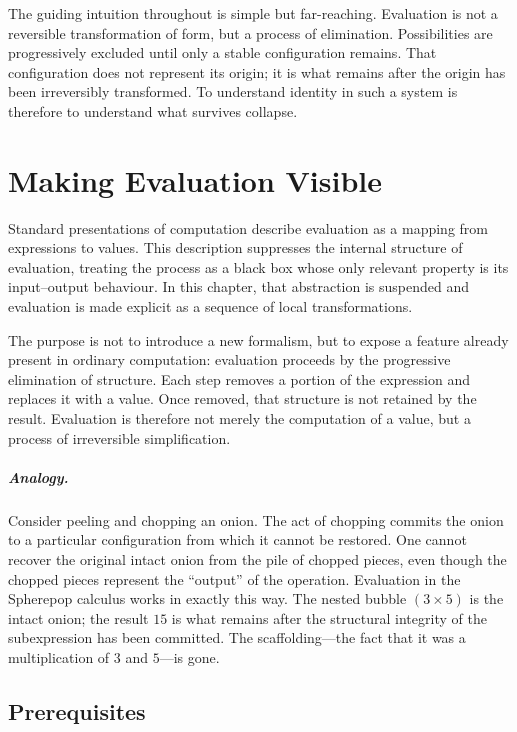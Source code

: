 \documentclass[12pt, oneside]{amsbook}
\theoremstyle{plain}
\theoremstyle{definition}
\theoremstyle{remark}
\begin{document}
The guiding intuition throughout is simple but far-reaching. Evaluation is not
a reversible transformation of form, but a process of elimination. Possibilities
are progressively excluded until only a stable configuration remains. That
configuration does not represent its origin; it is what remains after the
origin has been irreversibly transformed. To understand identity in such a
system is therefore to understand what survives collapse.

\chapter{Making Evaluation Visible}
\label{ch:visible}

Standard presentations of computation describe evaluation as a mapping from
expressions to values. This description suppresses the internal structure of
evaluation, treating the process as a black box whose only relevant property is
its input--output behaviour. In this chapter, that abstraction is suspended and
evaluation is made explicit as a sequence of local transformations.

The purpose is not to introduce a new formalism, but to expose a feature
already present in ordinary computation: evaluation proceeds by the progressive
elimination of structure. Each step removes a portion of the expression and
replaces it with a value. Once removed, that structure is not retained by the
result. Evaluation is therefore not merely the computation of a value, but a
process of irreversible simplification.

\paragraph{Analogy.}
Consider peeling and chopping an onion. The act of chopping commits the onion to a particular configuration from which it cannot be restored. One cannot recover the original intact onion from the pile of chopped pieces, even though the chopped pieces represent the ``output'' of the operation. Evaluation in the Spherepop calculus works in exactly this way. The nested bubble $(3 \times 5)$ is the intact onion; the result $15$ is what remains after the structural integrity of the subexpression has been committed. The scaffolding---the fact that it was a multiplication of $3$ and $5$---is gone.

\section{Prerequisites}
\end{document}
